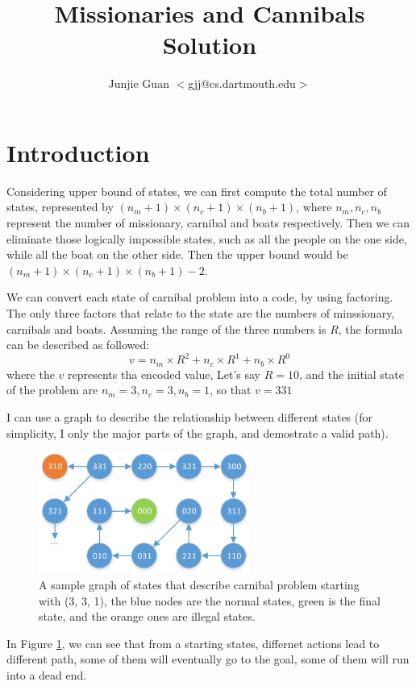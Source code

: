 \documentclass{article}
\title{Missionaries and Cannibals Solution}
\author{Junjie Guan $<$gjj@cs.dartmouth.edu$>$}
\begin{document}
\maketitle

\section{Introduction}


Considering upper bound of states, we can first compute the total number of states, represented by $(n_m + 1) \times (n_c+1) \times (n_b+1)$, where $n_m, n_c, n_b$ represent the number of missionary, carnibal and boats respectively. Then we can eliminate those logically impossible states, such as all the people on the one side, while all the boat on the other side. Then the upper bound would be $(n_m + 1) \times (n_c+1) \times (n_b+1) - 2$.

We can convert each state of carnibal problem into a code, by using factoring. The only three factors that relate to the state are the numbers of minssionary, carnibals and boats. Assuming the range of the three numbers is $R$, the formula can be described as followed:
$$v = n_m \times R^2 + n_c \times R^1 + n_b \times R^0$$
where the $v$ represents tha encoded value,  Let's say $R = 10$, and the initial state of the problem are $n_m = 3, n_c = 3, n_b = 1$, so that $v = 331$ 

I can use a graph to describe the relationship between different states (for simplicity, I only the major parts of the graph, and demostrate a valid path).

\begin{figure}[!h]
\centering
\includegraphics[width=0.618\textwidth]{hw1.pdf}
\caption{A sample graph of states that describe carnibal problem starting with (3, 3, 1), the blue nodes are the normal states, green is the final state, and the orange ones are illegal states.}
\label{states}
\end{figure}

In Figure \ref{states}, we can see that from a starting states, differnet actions lead to different path, some of them will eventually go to the goal, some of them will run into a dead end.
\end{document}
